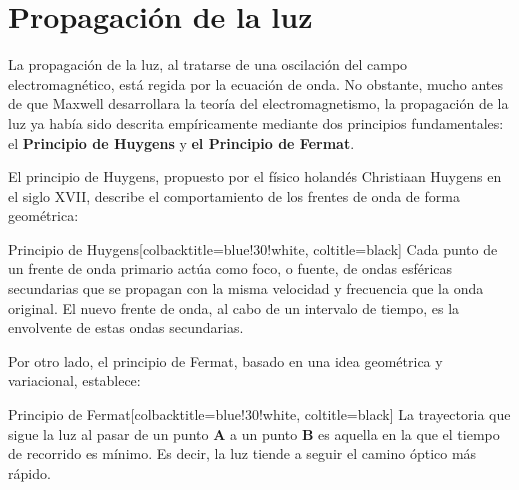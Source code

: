 %

\section*{Propagación de la luz}

La propagación de la luz, al tratarse de una oscilación del campo electromagnético, está regida por la ecuación de onda. No obstante, mucho antes de que Maxwell desarrollara la teoría del electromagnetismo, la propagación de la luz ya había sido descrita empíricamente mediante dos principios fundamentales: el \textbf{Principio de Huygens} y \textbf{el Principio de Fermat}.

El principio de Huygens, propuesto por el físico holandés Christiaan Huygens en el siglo XVII, describe el comportamiento de los frentes de onda de forma geométrica:

\begin{mybox}[green]{Principio de Huygens}[colbacktitle=blue!30!white, coltitle=black]
	Cada punto de un frente de onda primario actúa como foco, o fuente, de ondas esféricas secundarias que se propagan con la misma velocidad y frecuencia que la onda original. El nuevo frente de onda, al cabo de un intervalo de tiempo, es la envolvente de estas ondas secundarias.
\end{mybox}

Por otro lado, el principio de Fermat, basado en una idea geométrica y variacional, establece:

\begin{mybox}[green]{Principio de Fermat}[colbacktitle=blue!30!white, coltitle=black]
	La trayectoria que sigue la luz al pasar de un punto \textbf{A} a un punto \textbf{B} es aquella en la que el tiempo de recorrido es mínimo. Es decir, la luz tiende a seguir el camino óptico más rápido.
\end{mybox}

\vspace{0.3cm}

